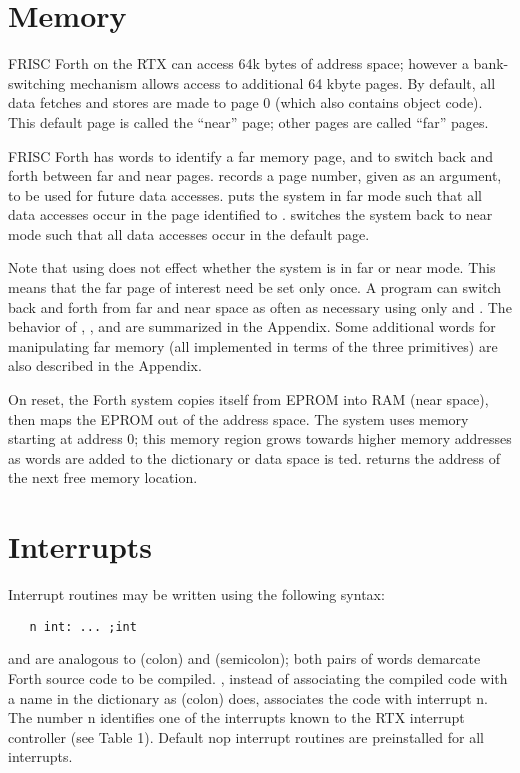 \section{Memory}
FRISC Forth on the RTX can access 64k bytes of address space;
however a bank-switching mechanism allows access to additional
64 kbyte pages.  By default, all data fetches and stores are made to
page 0 (which also contains object code).  This default page
is called the ``near'' page; other pages are called ``far''
pages.

FRISC Forth has words to identify a far memory page,
and to switch back and forth between far and near pages.
 records a page number, given as an
argument, to be used for future data accesses.
 puts the system in far mode
such that all data accesses occur in the page
identified to .   switches the system
back to near mode such that all data accesses occur
in the default page.

Note that using  does not effect whether the
system is in far or near mode.  This means that the far page
of interest need be set only once.  A program can switch back
and forth from far and near space as often as necessary
using only  and .  The behavior of ,
, and  are summarized in the Appendix.
Some additional words for manipulating far memory (all implemented
in terms of the three primitives) are also described in the Appendix.

On reset, the Forth system copies itself from EPROM into RAM
(near space),
then maps the EPROM out of the address space.
The system uses memory starting at address 0; this memory region
grows towards higher memory addresses as words are added
to the dictionary or data space is ted.   returns
the address of the next free memory location.

\section{Interrupts}
Interrupt routines may be written using the following syntax:
\begin{verbatim}
   n int: ... ;int
\end{verbatim}
 and  are analogous to \fw{:} (colon) and \fw{;}
(semicolon); both pairs of words demarcate Forth source code to be compiled.
, instead of associating the compiled code with a name in the
dictionary as \fw{:} (colon) does, associates the code with interrupt
\num{n}.  The number \num{n} identifies one of the interrupts
known to the RTX interrupt controller (see Table 1).
Default nop interrupt routines are preinstalled for all interrupts.

